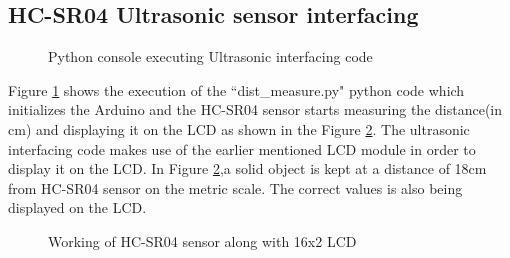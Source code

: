 \documentclass{article}
\begin{document}
\pagebreak
\subsection{HC-SR04 Ultrasonic sensor interfacing}
\begin{figure}[H]
    \centering
    \caption{Python console executing Ultrasonic interfacing code}
    \label{fig:us_run}
\end{figure}
\vspace{20pt}
Figure \ref{fig:us_run} shows the execution of the ``dist\_measure.py" python code which initializes the Arduino and the HC-SR04 sensor starts measuring the distance(in cm) and displaying it on the LCD as shown in the Figure \ref{fig:us_output}. The ultrasonic interfacing code makes use of the earlier mentioned LCD module in order to display it on the LCD. In Figure \ref{fig:us_output},a solid object is kept at a distance of 18cm from HC-SR04 sensor on the metric scale. The correct values is also being displayed on the LCD.
\begin{figure}
    \centering
    \caption{Working of HC-SR04 sensor along with 16x2 LCD}
    \label{fig:us_output}
\end{figure}
\end{document}
